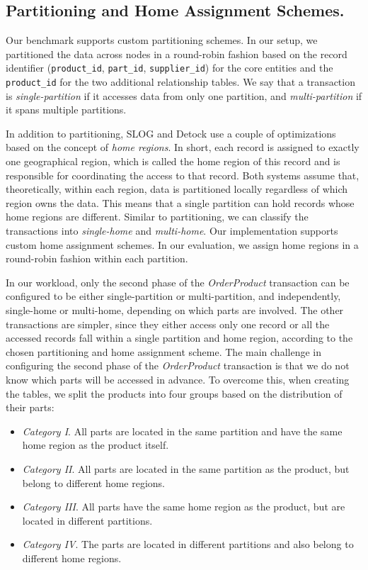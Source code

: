 \subsection{Partitioning and Home Assignment Schemes.}
\label{subsec: partitioning-and-home-assignment-schemes}
Our benchmark supports custom partitioning schemes. In our setup, we partitioned the data across nodes in a round-robin fashion based on the record identifier (\texttt{product\_id}, \texttt{part\_id}, \texttt{supplier\_id}) for the core entities and the \texttt{product\_id} for the two additional relationship tables. We say that a transaction is \textit{single-partition} if it accesses data from only one partition, and \textit{multi-partition} if it spans multiple partitions.

In addition to partitioning, SLOG and Detock use a couple of optimizations based on the concept of \textit{home regions}. In short, each record is assigned to exactly one geographical region, which is called the home region of this record and is responsible for coordinating the access to that record. Both systems assume that, theoretically, within each region, data is partitioned locally regardless of which region owns the data. This means that a single partition can hold records whose home regions are different. Similar to partitioning, we can classify the transactions into \textit{single-home} and \textit{multi-home}. Our implementation supports custom home assignment schemes. In our evaluation, we assign home regions in a round-robin fashion within each partition.

In our workload, only the second phase of the \textit{OrderProduct} transaction can be configured to be either single-partition or multi-partition, and independently, single-home or multi-home, depending on which parts are involved. The other transactions are simpler, since they either access only one record or all the accessed records fall within a single partition and home region, according to the chosen partitioning and home assignment scheme. The main challenge in configuring the second phase of the \textit{OrderProduct} transaction is that we do not know which parts will be accessed in advance. To overcome this, when creating the tables, we split the products into four groups based on the distribution of their parts:
\begin{itemize}
    \item \textit{Category I}. All parts are located in the same partition and have the same home region as the product itself.
    \item \textit{Category II}. All parts are located in the same partition as the product, but belong to different home regions.
    \item \textit{Category III}. All parts have the same home region as the product, but are located in different partitions.
    \item \textit{Category IV}. The parts are located in different partitions and also belong to different home regions.
\end{itemize}

